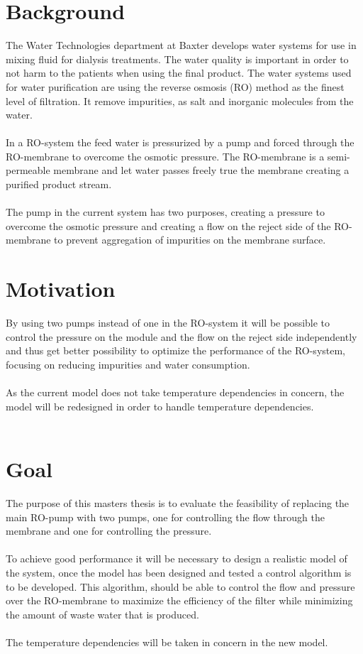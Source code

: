 
\section{Background}

The Water Technologies department at Baxter develops water systems for use in mixing fluid for dialysis treatments. The water quality is important in order to not harm to the patients when using the final product. The water systems used for water purification are using the reverse osmosis (RO) method as the finest level of filtration. It remove impurities, as salt and inorganic molecules from the water\cite{Dow}.\\
\\
In a RO-system the feed water is pressurized by a pump and forced through the RO-membrane to overcome the osmotic pressure. The RO-membrane is a semi-permeable membrane and let water passes freely true the membrane creating a purified product stream. \\
\\
The pump in the current system has two purposes, creating a pressure to overcome the osmotic pressure and creating a flow on the reject side of the RO-membrane to prevent aggregation of impurities on the membrane surface.\\


\section{Motivation}
By using two pumps instead of one in the RO-system it will be possible to control the pressure on the module and the flow on the reject side independently and thus get better possibility to optimize the performance of the RO-system, focusing on reducing impurities and water consumption. \\
\\
As the current model does not take temperature dependencies in concern, the model will be redesigned in order to handle temperature dependencies.  \\
\\
\section{Goal}
The purpose of this masters thesis is to evaluate the feasibility of replacing the main RO-pump with two pumps, one for controlling the flow through the membrane and one for controlling the pressure. \\
\\
To achieve good performance it will be necessary to design a realistic model of the system, once the model has been designed and tested a control algorithm is to be developed. This algorithm, should be able to control the flow and pressure over the RO-membrane to maximize the efficiency of the filter while minimizing the amount of waste water that is produced. \\
\\
The temperature dependencies will be taken in concern in the new model.

